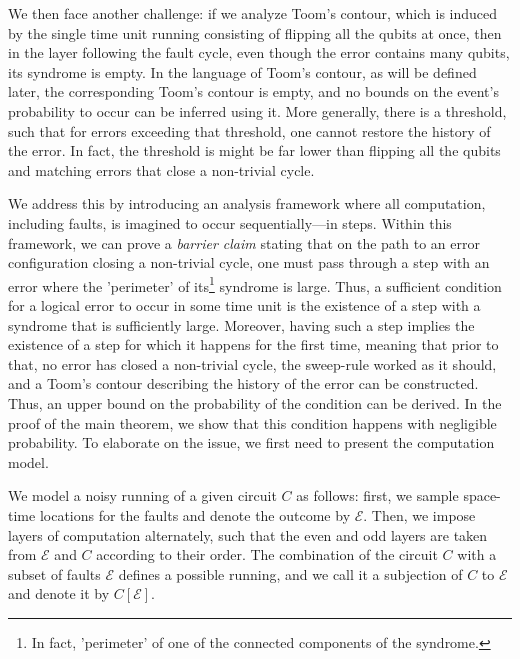 We then face another challenge: if we analyze Toom's contour, which is induced by the single time unit running consisting of flipping all the qubits at once, then in the layer following the fault cycle, even though the error contains many qubits, its syndrome is empty. In the language of Toom's contour, as will be defined later, the corresponding Toom's contour is empty, and no bounds on the event's probability to occur can be inferred using it. 
More generally, there is a threshold, such that for errors exceeding that threshold, one cannot restore the history of the error. In fact, the threshold is might be far lower than flipping all the qubits and matching errors that close a non-trivial cycle.


We address this by introducing an analysis framework where all computation, including faults, is imagined to occur sequentially—in steps. Within this framework, we can prove a \textit{barrier claim} stating that on the path to an error configuration closing a non-trivial cycle, one must pass through a step with an error where the 'perimeter' of its\footnote{In fact, 'perimeter' of one of the connected components of the syndrome.} syndrome is large. Thus, a sufficient condition for a logical error to occur in some time unit is the existence of a step with a syndrome that is sufficiently large.  
Moreover, having such a step implies the existence of a step for which it happens for the first time, meaning that prior to that, no error has closed a non-trivial cycle, the sweep-rule worked as it should, and a Toom's contour describing the history of the error can be constructed. Thus, an upper bound on the probability of the condition can be derived. In the proof of the main theorem, we show that this condition happens with negligible probability. To elaborate on the issue, we first need to present the computation model.

We model a noisy running of a given circuit $C$ as follows: first, we sample space-time locations for the faults and denote the outcome by $\mathcal{E}$. Then, we impose layers of computation alternately, such that the even and odd layers are taken from $\mathcal{E}$ and $C$ according to their order. The combination of the circuit $C$ with a subset of faults $\mathcal{E}$ defines a possible running, and we call it a subjection of $C$ to $\mathcal{E}$ and denote it by $C[\mathcal{E}]$. %


